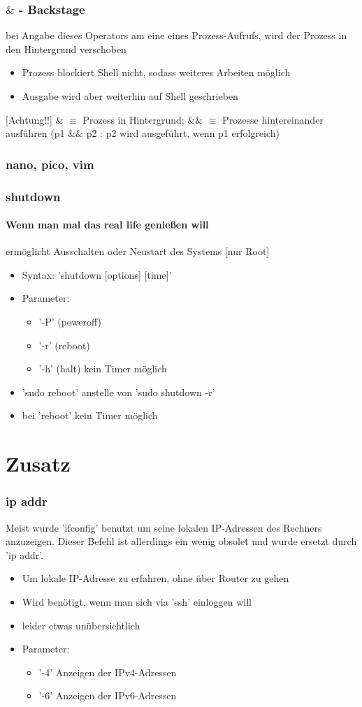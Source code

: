 \documentclass[12pt,utf8]{beamer}
\begin{document}
\begin{frame}
\frametitle{$\&$ - Backstage}
bei Angabe dieses Operators am eine eines Prozess-Aufrufs, wird der Prozess in den Hintergrund verschoben
\begin{itemize}[<+->]
	\item Prozess blockiert Shell nicht, sodass weiteres Arbeiten möglich
	\item Ausgabe wird aber weiterhin auf Shell geschrieben
\end{itemize}
[Achtung!!] $\&$ $\equiv$ Prozess in Hintergrund; $\&\&$ $\equiv$ Prozesse hintereinander ausführen (p1 $\&\&$ p2 : p2 wird ausgeführt, wenn p1 erfolgreich)
\end{frame}

\begin{frame}
\frametitle{nano, pico, vim}
\end{frame}

\begin{frame}
\frametitle{shutdown}
\framesubtitle{Wenn man mal das real life genießen will}
ermöglicht Ausschalten oder Neustart des Systems [nur Root]
\begin{itemize}[<+->]
	\item Syntax: 'shutdown [options] [time]'
	\item Parameter:
	\begin{itemize}[<+->]
		\item '-P' (poweroff)
		\item '-r' (reboot) 
		\item '-h' (halt) kein Timer möglich
	\end{itemize}
	\item 'sudo reboot' anstelle von 'sudo shutdown -r'
	\item bei 'reboot' kein Timer möglich
\end{itemize}
\end{frame}

\section{Zusatz}
\begin{frame}
\frametitle{ip addr}
Meist wurde 'ifconfig' benutzt um seine lokalen IP-Adressen des Rechners anzuzeigen. Dieser Befehl ist allerdings ein wenig obsolet und wurde ersetzt durch 'ip addr'.
\begin{itemize}
	\item Um lokale IP-Adresse zu erfahren, ohne über Router zu gehen
	\item Wird benötigt, wenn man sich via 'ssh' einloggen will
	\item leider etwas unübersichtlich
	\item Parameter:
	\begin{itemize}
		\item '-4' Anzeigen der IPv4-Adressen
		\item '-6' Anzeigen der IPv6-Adressen
	\end{itemize}
\end{itemize}
\end{frame}
\end{document}
